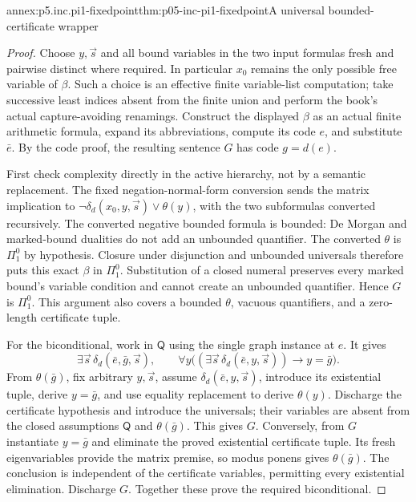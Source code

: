 \begin{annexitem}{annex:p5.inc.pi1-fixedpoint}{thm:p05-inc-pi1-fixedpoint}{A universal bounded-certificate wrapper}
\begin{proof}
Choose \(y,\vec s\) and all bound variables in the two input formulas
fresh and pairwise distinct where required. In particular \(x_0\)
remains the only possible free variable of \(\beta\). Such a choice
is an effective finite variable-list computation; take successive least
indices absent from the finite union and perform the book's actual
capture-avoiding renamings. Construct the displayed \(\beta\) as an
actual finite arithmetic formula, expand its abbreviations, compute its
code \(e\), and substitute \(\bar e\). By the code proof, the
resulting sentence \(G\) has code \(g=d(e)\).

First check complexity directly in the active hierarchy, not by a
semantic replacement. The fixed negation-normal-form conversion sends
the matrix implication to
\(\neg\delta_d(x_0,y,\vec s)\lor\theta(y)\), with the two
subformulas converted recursively. The converted negative bounded
formula is bounded: De Morgan and marked-bound dualities do not add an
unbounded quantifier. The converted \(\theta\) is \(\Pi^0_1\)
by hypothesis. Closure under disjunction and unbounded universals
therefore puts this exact \(\beta\) in \(\Pi^0_1\). Substitution
of a closed numeral preserves every marked bound's variable condition
and cannot create an unbounded quantifier. Hence \(G\) is
\(\Pi^0_1\). This argument also covers a bounded \(\theta\),
vacuous quantifiers, and a zero-length certificate tuple.

For the biconditional, work in \(\mathsf Q\) using the single graph
instance at \(e\). It gives
\[
 \exists\vec s\,\delta_d(\bar e,\bar g,\vec s),\qquad
 \forall y\bigl((\exists\vec s\,\delta_d(\bar e,y,\vec s))
                                      \to y=\bar g\bigr).
\]
From \(\theta(\bar g)\), fix arbitrary \(y,\vec s\), assume
\(\delta_d(\bar e,y,\vec s)\), introduce its existential tuple,
derive \(y=\bar g\), and use equality replacement to derive
\(\theta(y)\). Discharge the certificate hypothesis and introduce
the universals; their variables are absent from the closed assumptions
\(\mathsf Q\) and \(\theta(\bar g)\). This gives \(G\).
Conversely, from \(G\) instantiate \(y=\bar g\) and eliminate
the proved existential certificate tuple. Its fresh eigenvariables
provide the matrix premise, so modus ponens gives
\(\theta(\bar g)\). The conclusion is independent of the certificate
variables, permitting every existential elimination. Discharge \(G\).
Together these prove the required biconditional.


\end{proof}
\end{annexitem}
